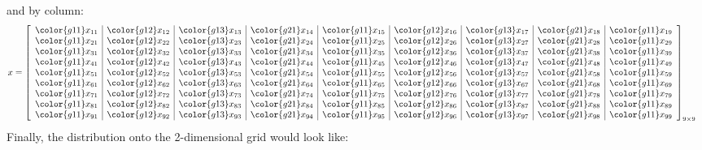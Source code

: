and by column:
\begin{align*}
x &= \left[
      \begin{array}{l|l|l|l|l|l|l|l|l}
      \color{g11}x_{11} & \color{g12}x_{12} & \color{g13}x_{13} & \color{g21}x_{14} & \color{g11}x_{15} & \color{g12}x_{16} & \color{g13}x_{17} & \color{g21}x_{18} & \color{g11}x_{19}\\
      \color{g11}x_{21} & \color{g12}x_{22} & \color{g13}x_{23} & \color{g21}x_{24} & \color{g11}x_{25} & \color{g12}x_{26} & \color{g13}x_{27} & \color{g21}x_{28} & \color{g11}x_{29}\\
      \color{g11}x_{31} & \color{g12}x_{32} & \color{g13}x_{33} & \color{g21}x_{34} & \color{g11}x_{35} & \color{g12}x_{36} & \color{g13}x_{37} & \color{g21}x_{38} & \color{g11}x_{39}\\
      \color{g11}x_{41} & \color{g12}x_{42} & \color{g13}x_{43} & \color{g21}x_{44} & \color{g11}x_{45} & \color{g12}x_{46} & \color{g13}x_{47} & \color{g21}x_{48} & \color{g11}x_{49}\\
      \color{g11}x_{51} & \color{g12}x_{52} & \color{g13}x_{53} & \color{g21}x_{54} & \color{g11}x_{55} & \color{g12}x_{56} & \color{g13}x_{57} & \color{g21}x_{58} & \color{g11}x_{59}\\
      \color{g11}x_{61} & \color{g12}x_{62} & \color{g13}x_{63} & \color{g21}x_{64} & \color{g11}x_{65} & \color{g12}x_{66} & \color{g13}x_{67} & \color{g21}x_{68} & \color{g11}x_{69}\\
      \color{g11}x_{71} & \color{g12}x_{72} & \color{g13}x_{73} & \color{g21}x_{74} & \color{g11}x_{75} & \color{g12}x_{76} & \color{g13}x_{77} & \color{g21}x_{78} & \color{g11}x_{79}\\
      \color{g11}x_{81} & \color{g12}x_{82} & \color{g13}x_{83} & \color{g21}x_{84} & \color{g11}x_{85} & \color{g12}x_{86} & \color{g13}x_{87} & \color{g21}x_{88} & \color{g11}x_{89}\\
      \color{g11}x_{91} & \color{g12}x_{92} & \color{g13}x_{93} & \color{g21}x_{94} & \color{g11}x_{95} & \color{g12}x_{96} & \color{g13}x_{97} & \color{g21}x_{98} & \color{g11}x_{99}\\
      \end{array}
\right]_{9\times 9}
\end{align*}
Finally, the distribution onto the 2-dimensional grid would look like:
